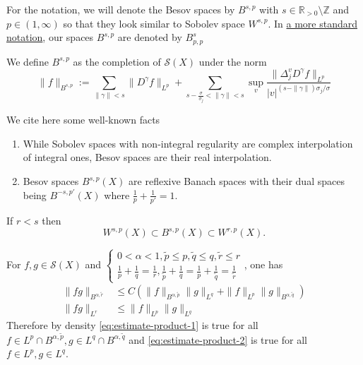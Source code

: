 For the notation, we will denote the Besov spaces by \(B^{s,p}\) with \(s\in \mathbb{R}_{>0}\setminus
\mathbb{Z}\) and \(p\in (1,\infty)\) so that they look similar to Sobolev space \(W^{s,p}\). In \href{https://en.wikipedia.org/wiki/Besov\_space}{a more standard notation}, our spaces \(B^{s,p}\) are denoted by \(B^{s}_{p,p}\)

\begin{definition}
We define \(B^{s,p}\) as the completion of \(\mathcal{S}(X)\) under the norm
\[
\|f\|_{B^{s,p}} := \sum_{\|\gamma\| < s} \|D^\gamma f\|_{L^p} +
\sum_{ s- \frac{\sigma}{\sigma_j} < \|\gamma\| < s}\sup_{v} \frac{\|\Delta^v_j D^\gamma
f\|_{L^p}}{|v|^{(s - \|\gamma\|) \sigma_j/\sigma}}
\]
\end{definition}

We cite here some well-known facts
\begin{enumerate}
\item While Sobolev spaces with non-integral regularity are complex interpolation of integral
ones, Besov spaces are their real interpolation.
\item Besov spaces \(B^{s,p}(X)\) are reflexive Banach spaces with their dual spaces being
\(B^{-s,p'}(X)\) where \(\frac{1}{p} + \frac{1}{p'}=1\).
\end{enumerate}

\begin{theorem}
\label{thm:besov-sobolev}
If \(r < s\) then
\[
 W^{s,p}(X) \subset B^{s,p}(X) \subset W^{r,p}(X).
\]
\end{theorem}

\begin{theorem}[Multiplication]
\label{thm:estimate-product}
For \(f,g\in \mathcal{S}(X)\) and \(\begin{cases}
0<\alpha <1, \tilde p \leq p,\tilde q \leq q,\tilde r\leq r \\
\frac{1}{p} + \frac{1}{q} = \frac{1}{r}, \frac{1}{\tilde p} + \frac{1}{q} = \frac{1}{p} +
\frac{1}{\tilde q} = \frac{1}{\tilde r}				      
				       \end{cases}\),  one has
\begin{align}
\|fg\|_{B^{\alpha,\tilde r}} &\leq C \left( \|f\|_{B^{\alpha,\tilde p}}\|g\|_{L^q} + \|f\|_{L^p}\|g\|_{B^{\alpha,\tilde q}} \right) \label{eq:estimate-product-1} \\
\|fg\|_{L^r} &\leq \|f\|_{L^p}\|g\|_{L^q} \label{eq:estimate-product-2}
\end{align}
Therefore by density \eqref{eq:estimate-product-1} is true for all \(f\in L^p\cap
B^{\alpha,\tilde p}, g\in L^q\cap B^{\alpha,\tilde q}\) and \eqref{eq:estimate-product-2}
is true for all \(f\in L^p, g\in L^q\).
\end{theorem}

